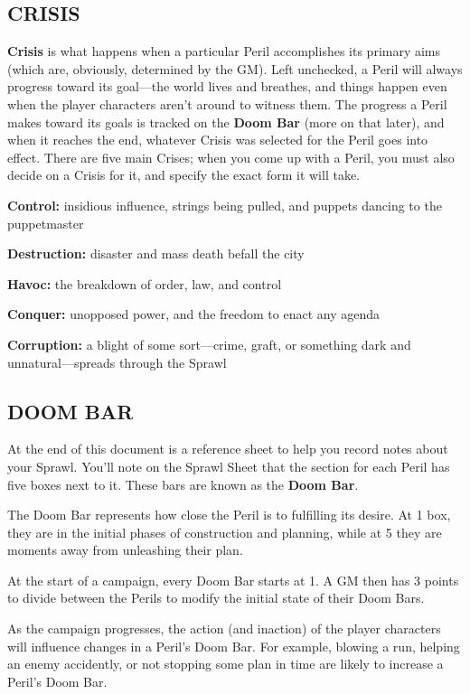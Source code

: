 \documentclass[oneside,10pt]{article}
\begin{document}
\begin{multicols}{2}
\subsection{CRISIS}
\textbf{Crisis} is what happens when a particular Peril accomplishes
its primary aims (which are, obviously, determined by the
GM). Left unchecked, a Peril will always progress toward its
goal—the world lives and breathes, and things happen even
when the player characters aren’t around to witness them.
The progress a Peril makes toward its goals is tracked on the
\textbf{Doom Bar} (more on that later), and when it reaches the end,
whatever Crisis was selected for the Peril goes into effect.
There are five main Crises; when you come up with a Peril,
you must also decide on a Crisis for it, and specify the exact
form it will take.
\begin{adjustwidth*}{.5cm}{.5cm}

\textbf{Control:} insidious influence, strings being pulled, and puppets dancing to the puppetmaster

\textbf{Destruction:} disaster and mass death befall the city

\textbf{Havoc:} the breakdown of order, law, and control

\textbf{Conquer:} unopposed power, and the freedom to enact
any agenda

\textbf{Corruption:} a blight of some sort—crime, graft, or something dark and unnatural—spreads through the Sprawl
\end{adjustwidth*}
\subsection{DOOM BAR}
At the end of this document is a reference sheet to help you
record notes about your Sprawl. You’ll note on the Sprawl
Sheet that the section for each Peril has five boxes next to it.
These bars are known as the \textbf{Doom Bar}.

The Doom Bar represents how close the Peril is to fulfilling its
desire. At 1 box, they are in the initial phases of construction
and planning, while at 5 they are moments away from unleashing their plan.

At the start of a campaign, every Doom Bar starts at 1. A GM
then has 3 points to divide between the Perils to modify the
initial state of their Doom Bars.

As the campaign progresses, the action (and inaction) of the
player characters will influence changes in a Peril’s Doom Bar.
For example, blowing a run, helping an enemy accidently, or
not stopping some plan in time are likely to increase a Peril’s
Doom Bar.


\end{multicols}
\end{document}
